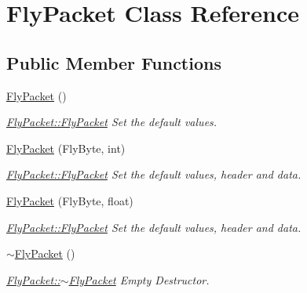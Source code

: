 \hypertarget{class_fly_packet}{}\section{Fly\+Packet Class Reference}
\label{class_fly_packet}
\subsection*{Public Member Functions}
\begin{DoxyCompactItemize}
\item 
\hypertarget{class_fly_packet_aca19954f7e01d839b5759245a9950d57}{}\label{class_fly_packet_aca19954f7e01d839b5759245a9950d57} 
\hyperlink{class_fly_packet_aca19954f7e01d839b5759245a9950d57}{Fly\+Packet} ()
\begin{DoxyCompactList}\small\item\em \hyperlink{class_fly_packet_aca19954f7e01d839b5759245a9950d57}{Fly\+Packet\+::\+Fly\+Packet} Set the default values. \end{DoxyCompactList}\item 
\hyperlink{class_fly_packet_ac6a9ad5c29755d32ae52bb3526563d79}{Fly\+Packet} (Fly\+Byte, int)
\begin{DoxyCompactList}\small\item\em \hyperlink{class_fly_packet_aca19954f7e01d839b5759245a9950d57}{Fly\+Packet\+::\+Fly\+Packet} Set the default values, header and data. \end{DoxyCompactList}\item 
\hyperlink{class_fly_packet_a24c7957a841f24405f26ceb918e15a04}{Fly\+Packet} (Fly\+Byte, float)
\begin{DoxyCompactList}\small\item\em \hyperlink{class_fly_packet_aca19954f7e01d839b5759245a9950d57}{Fly\+Packet\+::\+Fly\+Packet} Set the default values, header and data. \end{DoxyCompactList}\item 
\hypertarget{class_fly_packet_a58a219b0a59c413237eea53dc6231fcf}{}\label{class_fly_packet_a58a219b0a59c413237eea53dc6231fcf} 
\hyperlink{class_fly_packet_a58a219b0a59c413237eea53dc6231fcf}{$\sim$\+Fly\+Packet} ()
\begin{DoxyCompactList}\small\item\em \hyperlink{class_fly_packet_a58a219b0a59c413237eea53dc6231fcf}{Fly\+Packet\+::$\sim$\+Fly\+Packet} Empty Destructor. \end{DoxyCompactList}\item 

\end{DoxyCompactItemize}
